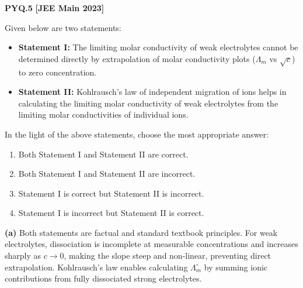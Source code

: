 \begin{problembox}
\textbf{PYQ.5} \hfill \textbf{[JEE Main 2023]}

Given below are two statements:
\begin{itemize}
    \item \textbf{Statement I:} The limiting molar conductivity of weak electrolytes cannot be determined directly by extrapolation of molar conductivity plots ($\Lambda_m$ vs $\sqrt{c}$) to zero concentration.
    \item \textbf{Statement II:} Kohlrausch's law of independent migration of ions helps in calculating the limiting molar conductivity of weak electrolytes from the limiting molar conductivities of individual ions.
\end{itemize}
In the light of the above statements, choose the most appropriate answer:
\begin{enumerate}[label=(\alph*)]
    \item Both Statement I and Statement II are correct.
    \item Both Statement I and Statement II are incorrect.
    \item Statement I is correct but Statement II is incorrect.
    \item Statement I is incorrect but Statement II is correct.
\end{enumerate}
\end{problembox}
\begin{solution}
\textbf{(a)} Both statements are factual and standard textbook principles. For weak electrolytes, dissociation is incomplete at measurable concentrations and increases sharply as $c \to 0$, making the slope steep and non-linear, preventing direct extrapolation. Kohlrausch's law enables calculating $\Lambda_m^\circ$ by summing ionic contributions from fully dissociated strong electrolytes.
\end{solution}

